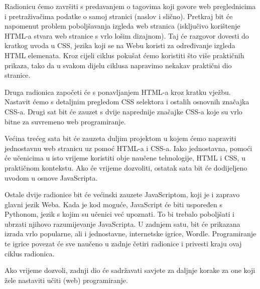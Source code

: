 Radionicu ćemo završiti s predavanjem o tagovima koji govore web preglednicima i pretraživačima podatke o samoj stranici (naslov i slično).
Pretkraj bit će napomenut problem poboljšavanja izgleda web stranica (isključivo korištenje HTML-a stvara web stranice s vrlo lošim dizajnom).
Taj će razgovor dovesti do kratkog uvoda u CSS, jezika koji se na Webu koristi za određivanje izgleda HTML elemenata.
Kroz cijeli ciklus pokušat ćemo koristiti što više praktičnih prikaza, tako da u svakom dijelu ciklusa napravimo nekakav praktični dio stranice.

Druga radionica započeti će s ponavljanjem HTML-a kroz kratku vježbu.
Nastavit ćemo s detaljnim pregledom CSS selektora i ostalih osnovnih značajka CSS-a.
Drugi sat bit će zauzet s dvije naprednije značajke CSS-a koje su vrlo bitne za suvremeno web programiranje.

Većina trećeg sata bit će zauzeta duljim projektom u kojem ćemo napraviti jednostavnu web stranicu uz pomoć HTML-a i CSS-a.
Iako jednostavna, pomoći će učenicima u isto vrijeme koristiti obje naučene tehnologije, HTML i CSS, u praktičnom kontekstu.
Ako će vrijeme dozvoliti, ostatak sata bit će dodijeljeno uvodom u osnove JavaScripta.

Ostale dvije radionice bit će većinski zauzete JavaScriptom, koji je i zapravo glavni jezik Weba.
Kada je kod moguće, JavaScript će biti uspoređen s Pythonom, jezik s kojim su učenici već upoznati.
To bi trebalo poboljšati i ubrzati njihovo razumijevanje JavaScripta.
U zadnjem satu, bit će prikazana izrada vrlo popularne, ali i jednostavne, internetske igrice, Wordle.
Programiranje te igrice povezat će sve naučeno u zadnje četiri radionice i privesti kraju ovaj ciklus radionica.

Ako vrijeme dozvoli, zadnji dio će sadržavati savjete za daljnje korake za one koji žele nastaviti učiti (web) programiranje.
